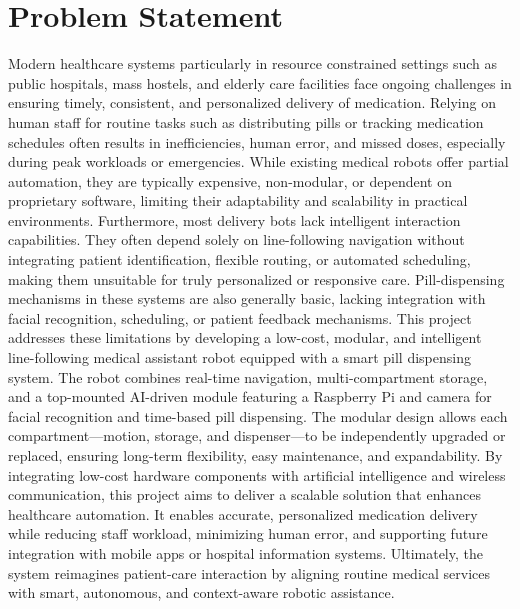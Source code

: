 \vspace{1.5\baselineskip} 

\section{Problem Statement}
Modern healthcare systems particularly in resource constrained settings such as public hospitals, mass hostels, and elderly care facilities face ongoing challenges in ensuring timely, consistent, and personalized delivery of medication. Relying on human staff for routine tasks such as distributing pills or tracking medication schedules often results in inefficiencies, human error, and missed doses, especially during peak workloads or emergencies. While existing medical robots offer partial automation, they are typically expensive, non-modular, or dependent on proprietary software, limiting their adaptability and scalability in practical environments.
Furthermore, most delivery bots lack intelligent interaction capabilities. They often depend solely on line-following navigation without integrating patient identification, flexible routing, or automated scheduling, making them unsuitable for truly personalized or responsive care. Pill-dispensing mechanisms in these systems are also generally basic, lacking integration with facial recognition, scheduling, or patient feedback mechanisms.
This project addresses these limitations by developing a low-cost, modular, and intelligent line-following medical assistant robot equipped with a smart pill dispensing system. The robot combines real-time navigation, multi-compartment storage, and a top-mounted AI-driven module featuring a Raspberry Pi and camera for facial recognition and time-based pill dispensing. The modular design allows each compartment—motion, storage, and dispenser—to be independently upgraded or replaced, ensuring long-term flexibility, easy maintenance, and expandability.
By integrating low-cost hardware components with artificial intelligence and wireless communication, this project aims to deliver a scalable solution that enhances healthcare automation. It enables accurate, personalized medication delivery while reducing staff workload, minimizing human error, and supporting future integration with mobile apps or hospital information systems. Ultimately, the system reimagines patient-care interaction by aligning routine medical services with smart, autonomous, and context-aware robotic assistance.
 

\vspace{1.5\baselineskip} 

